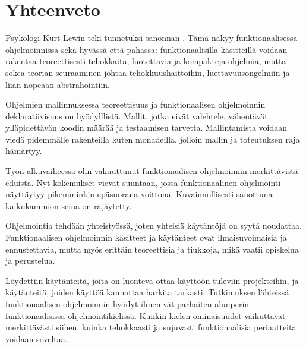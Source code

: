 \clearpage%
\vspace{21.5pt}
\chapter{Yhteenveto}

Psykologi Kurt Lewin teki tunnetuksi sanonnan  \cite{practicaltheory}. Tämä näkyy funktionaalisessa ohjelmoinnissa sekä hyvässä että pahassa: funktionaalisilla käsitteillä voidaan rakentaa teoreettisesti tehokkaita, luotettavia ja kompakteja ohjelmia, mutta sokea teorian seuraaminen johtaa tehokkuushaittoihin, luettavuusongelmiin ja liian nopeaan abstrahointiin.

Ohjelmien mallinnuksessa teoreettisuus ja funktionaalisen ohjelmoinnin deklaratiivisuus on hyödylllistä. Mallit, jotka eivät valehtele, vähentävät ylläpidettävän koodin määrää ja testaamisen tarvetta. Mallintamista voidaan viedä pidemmälle rakenteilla kuten monadeilla, jolloin mallin ja toteutuksen raja hämärtyy.

Työn alkuvaiheessa olin vakuuttunut funktionaalisen ohjelmoinnin merkittävistä
eduista. Nyt kokemukset vievät suuntaan, jossa funktionaalinen ohjelmointi näyttäytyy
pikemminkin epäsuorana voittona. Kuvainnollisesti sanottuna kaikukammion seinä on
räjäytetty.

Ohjelmointia tehdään yhteistyössä, joten yhteisiä käytäntöjä on syytä noudattaa.
Funktionaalisen ohjelmoinnin käsitteet ja käytänteet ovat ilmaisuvoimaisia ja
ennustettavia, mutta myös erittäin teoreettisia ja tiukkoja, mikä vaatii opiskelua ja
perustelua.

Löydettiin käytänteitä, joita on luonteva ottaa käyttöön tuleviin projekteihin, ja käytänteitä, joiden käyttöä kannattaa harkita tarkasti. Tutkimuksen lähteissä funktionaalisen ohjelmoinnin hyödyt ilmenivät parhaiten alunperin funktionaalisissa ohjelmointikielissä. Kunkin kielen ominaisuudet vaikuttavat merkittävästi siihen, kuinka tehokkaasti ja sujuvasti funktionaalisia periaatteita voidaan soveltaa.
